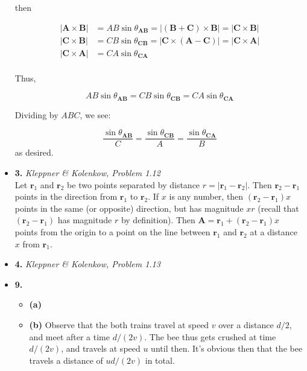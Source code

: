 \documentclass[tikz, 12pt,twoside]{article}
\begin{document}
\begin{itemize}
  then

  \begin{align*}
    \left|\mathbf{A}\times\mathbf{B}\right| &= \mathit{A}\mathit{B}\sin{\theta_{\mathbf{A}\mathbf{B}}}
    = |(\mathbf{B} + \mathbf{C}) \times \mathbf{B}| = |\mathbf{C} \times \mathbf{B}| \\
    \left|\mathbf{C}\times\mathbf{B}\right| &= \mathit{C}\mathit{B}\sin{\theta_{\mathbf{C}\mathbf{B}}}
    = |\mathbf{C} \times (\mathbf{A} - \mathbf{C})| = |\mathbf{C} \times \mathbf{A}| \\
    \left|\mathbf{C}\times\mathbf{A}\right| &= \mathit{C}\mathit{A}\sin{\theta_{\mathbf{C}\mathbf{A}}} \\
  \end{align*}

  Thus,

  $$
  \mathit{A}\mathit{B}\sin{\theta_{\mathbf{A}\mathbf{B}}} = \mathit{C}\mathit{B}\sin{\theta_{\mathbf{C}\mathbf{B}}} = \mathit{C}\mathit{A}\sin{\theta_{\mathbf{C}\mathbf{A}}}
  $$

  Dividing by $ABC$, we see:

  $$
  \frac{\sin{\theta_{\mathbf{A}\mathbf{B}}}}{C} = \frac{\sin{\theta_{\mathbf{C}\mathbf{B}}}}{A} = \frac{\sin{\theta_{\mathbf{C}\mathbf{A}}}}{B}
  $$
  as desired.



\item \textbf{3.} \emph{Kleppner \& Kolenkow, Problem 1.12} \\ \vspace{5mm}
  Let $\mathbf{r}_1$ and $\mathbf{r}_2$ be two points separated by distance $r = |\mathbf{r}_1 - \mathbf{r}_2|$. Then $\mathbf{r}_2 - \mathbf{r}_1$
  points in the direction from $\mathbf{r}_1$ to $\mathbf{r}_2$. If $x$ is any number, then $(\mathbf{r}_2 - \mathbf{r}_1)x$ points in the same
  (or opposite) direction, but has magnitude $xr$ (recall that $(\mathbf{r}_2 - \mathbf{r}_1)$ has magnitude $r$ by definition). Then
  $\mathbf{A} = \mathbf{r}_1 + (\mathbf{r}_2 - \mathbf{r}_1)x$ points from the origin to a point on the line between $\mathbf{r}_1$
  and $\mathbf{r}_2$ at a distance $x$ from $\mathbf{r}_1$.

\item \textbf{4.} \emph{Kleppner \& Kolenkow, Problem 1.13} \\ \vspace{5mm}

\item \textbf{9.} \\ \vspace{5mm}
  \begin{itemize}
  \item \textbf{(a)}
  \item \textbf{(b)}
    Observe that the both trains travel at speed $v$ over a distance $d/2$, and meet after a time $d/(2v)$.
    The bee thus gets crushed at time $d/(2v)$, and travels at speed $u$ until then. It's obvious then that
    the bee travels a distance of $ud/(2v)$ in total.
  \end{itemize}
\end{itemize}
\end{document}
